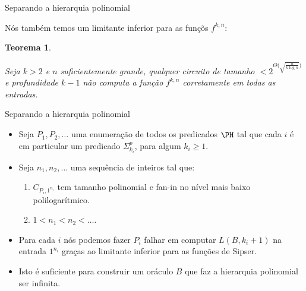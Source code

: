 \documentclass[landscape, 9pt]{beamer}
\newtheorem{teo}{Teorema}
\begin{document}

\begin{frame} {Separando a hierarquia polinomial}

Nós também temos um limitante inferior para as funçõs $f^{k, n}$:

\begin{teo} \label{Sipser_f_lb}

Seja $k > 2$ e $n$ suficientemente grande, qualquer circuito de tamanho $< 2^{\Theta\big(\sqrt{\frac{n}{k\log n}}\big)}$ e profundidade $k - 1$ não computa a função $f^{k, n}$ corretamente em todas as entradas.

\end{teo}

\end{frame}


\begin{frame} {Separando a hierarquia polinomial}

\begin{itemize}

	\item Seja $P_{1}, P_{2}, \dots$ uma enumeração de todos os predicados $\PH$ tal que cada $i$ é em particular um predicado $\Sigma_{k_{i}}^{p}$, para algum $k_{i} \geq 1$.

	\item Seja $n_{1}, n_{2}, \dots$ uma sequência de inteiros tal que:
	
	\begin{enumerate}
	
		\item $C_{P_{i}, 1^{n_{i}}}$ tem tamanho polinomial e fan-in no nível mais baixo polilogarítmico.
		
		\item $1 < n_{1} < n_{2} < \dots$.
	
	\end{enumerate}

	\item Para cada $i$ nós podemos fazer $P_{i}$ falhar em computar $L(B, k_{i} + 1)$ na entrada $1^{n_{i}}$ graças ao limitante inferior para as funções de Sipser.
	
	\item Isto é suficiente para construir um oráculo $B$ que faz a hierarquia polinomial ser infinita.

\end{itemize}

\end{frame}

\end{document}

